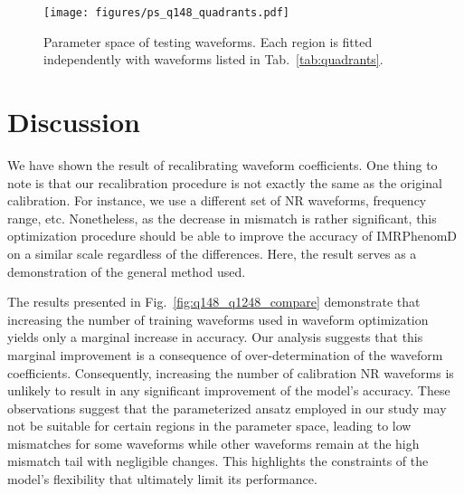 \documentclass[twocolumn]{aastex631}
\begin{document}
\begin{figure}[t]
	\centering
	\texttt{[image: figures/ps\_q148\_quadrants.pdf]}
	\caption{Parameter space of testing waveforms. Each region is fitted independently with waveforms listed in Tab.~\ref{tab:quadrants}.}
	\label{fig:ps_q148_quadrant}
\end{figure}

\section{Discussion} \label{sec:discussion}

We have shown the result of recalibrating waveform coefficients. One thing to
note is that our recalibration procedure is not exactly the same as the original
calibration. For instance, we use a different set of NR waveforms, frequency
range, etc. Nonetheless, as the decrease in mismatch is rather significant, this
optimization procedure should be able to improve the accuracy of IMRPhenomD on a
similar scale regardless of the differences. Here, the result serves as a
demonstration of the general method used.  

The results presented in Fig.~\ref{fig:q148_q1248_compare} demonstrate that
increasing the number of training waveforms used in waveform optimization yields
only a marginal increase in accuracy. Our analysis suggests that this marginal
improvement is a consequence of over-determination of the waveform coefficients.
Consequently, increasing the number of calibration NR waveforms is unlikely to
result in any significant improvement of the model's accuracy. These
observations suggest that the parameterized ansatz employed in our study may not
be suitable for certain regions in the parameter space, leading to low mismatches
for some waveforms while other waveforms remain at the high mismatch tail with
negligible changes. This highlights the constraints of the model's flexibility
that ultimately limit its performance.
\end{document}
